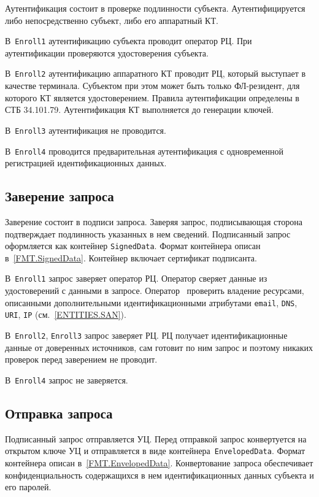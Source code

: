 Аутентификация состоит в проверке подлинности субъекта.
Аутентифицируется либо непосредственно субъект, либо его аппаратный КТ. 

В~\texttt{Enroll1} аутентификацию субъекта проводит оператор РЦ.
При аутентификации проверяются удостоверения субъекта. 

В~\texttt{Enroll2} аутентификацию аппаратного КТ проводит РЦ, который 
выступает в качестве терминала. Субъектом при этом может быть только 
ФЛ-резидент, для которого КТ является удостоверением. Правила 
аутентификации определены в СТБ 34.101.79. 
Аутентификация КТ выполняется до генерации ключей. 

В~\texttt{Enroll3} аутентификация не проводится.

В~\texttt{Enroll4} проводится предварительная аутентификация
с одновременной регистрацией идентификационных данных.

\subsection{Заверение запроса}\label{PROCESSES.Enroll.Signed}

Заверение состоит в подписи запроса. Заверяя запрос,
подписывающая сторона подтверждает подлинность указанных в нем сведений.
Подписанный запрос оформляется как контейнер \texttt{SignedData}.
Формат контейнера описан в~\ref{FMT.SignedData}. 
Контейнер включает сертификат подписанта.

В~\texttt{Enroll1} запрос заверяет оператор РЦ.
Оператор сверяет данные из удостоверений с данными в запросе.
%
Оператор~ проверить владение ресурсами, описанными
дополнительными идентификационными атрибутами \texttt{email}, \texttt{DNS},
\texttt{URI}, \texttt{IP} (см.~\ref{ENTITIES.SAN}).

В~\texttt{Enroll2}, \texttt{Enroll3} запрос заверяет РЦ.
РЦ получает идентификационные данные от доверенных источников,
сам готовит по ним запрос и поэтому никаких проверок перед заверением
не проводит.

В~\texttt{Enroll4} запрос не заверяется.

\subsection{Отправка запроса}\label{PROCESSES.Enroll.Enveloped}

Подписанный запрос отправляется УЦ. Перед отправкой запрос конвертуется на 
открытом ключе УЦ и отправляется в виде контейнера~\texttt{EnvelopedData}. 
Формат контейнера описан в~\ref{FMT.EnvelopedData}. 
Конвертование запроса обеспечивает конфиденциальность содержащихся в нем 
идентификационных данных субъекта и его паролей.  

